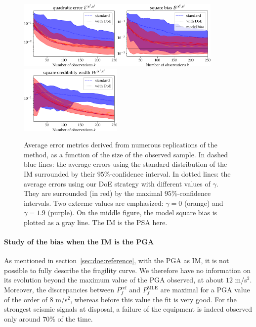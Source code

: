 \begin{figure}[h]
    \centering%
    \hspace*{-1cm}%
    \includegraphics[width=5cm]{figures/DoE/errE_PSA.pdf}\includegraphics[width=5cm]{figures/DoE/errB_PSA.pdf}\includegraphics[width=5cm]{figures/DoE/errW_PSA.pdf}%
    \caption{Average error metrics derived from numerous replications of the method, as a function of the size of the observed sample.
    In dashed blue lines: the average errors using the standard distribution of the IM surrounded by their $95\%$-confidence interval. In dotted lines: the average errors using our DoE strategy with different values of $\gamma$. They are surrounded (in red) by the maximal $95\%$-confidence intervals. Two extreme values are emphasized: $\gamma=0$ (orange) and $\gamma=1.9$ (purple).
    On the middle figure, the model square bias is plotted as a gray line.
     The IM  is the PSA here.}
    \label{fig:doe:errors-psa}
\end{figure}



\paragraph{Study of the bias when the IM is the PGA}
{As mentioned in section~\ref{sec:doe:reference}, with the PGA as IM, it is not possible to fully describe the fragility curve. We therefore have no information on its evolution beyond the maximum value of the PGA observed, at about $12$ m/s$^2$. Moreover, the discrepancies between $P_f^{\text{ref}}$ and $P_f^{\text{MLE}}$ are maximal for a PGA value of the order of $8$ m/s$^2$, whereas before this value the fit is very good.} For the strongest seismic signals at disposal, a failure of the equipment is indeed observed only around {$70\%$} of the time.

